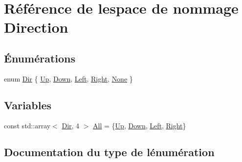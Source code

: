\hypertarget{namespaceDirection}{}\section{Référence de l\textquotesingle{}espace de nommage Direction}
\label{namespaceDirection}
\subsection*{Énumérations}
\begin{DoxyCompactItemize}
\item 
enum \hyperlink{namespaceDirection_aaa56ca1cc2883e1cab31b6cbb5054418}{Dir} \{ \newline
\hyperlink{namespaceDirection_aaa56ca1cc2883e1cab31b6cbb5054418a2dcf8e71283b05e59e3b7d1fa4228623}{Up}, 
\hyperlink{namespaceDirection_aaa56ca1cc2883e1cab31b6cbb5054418aad5dbfe9b746123d7af7381b52a183f1}{Down}, 
\hyperlink{namespaceDirection_aaa56ca1cc2883e1cab31b6cbb5054418aa6314d583c5d1432de99eb3fda30bdea}{Left}, 
\hyperlink{namespaceDirection_aaa56ca1cc2883e1cab31b6cbb5054418a1d010c1da83b45aa3ded2cb937d2d979}{Right}, 
\newline
\hyperlink{namespaceDirection_aaa56ca1cc2883e1cab31b6cbb5054418a1f9c924b3a1502e5e35ed148994c4148}{None}
 \}
\end{DoxyCompactItemize}
\subsection*{Variables}
\begin{DoxyCompactItemize}
\item 
const std\+::array$<$ \hyperlink{namespaceDirection_aaa56ca1cc2883e1cab31b6cbb5054418}{Dir}, 4 $>$ \hyperlink{namespaceDirection_aabd5fd5d609f7dda7f8f50f1dbd563a7}{All} = \{\hyperlink{namespaceDirection_aaa56ca1cc2883e1cab31b6cbb5054418a2dcf8e71283b05e59e3b7d1fa4228623}{Up}, \hyperlink{namespaceDirection_aaa56ca1cc2883e1cab31b6cbb5054418aad5dbfe9b746123d7af7381b52a183f1}{Down}, \hyperlink{namespaceDirection_aaa56ca1cc2883e1cab31b6cbb5054418aa6314d583c5d1432de99eb3fda30bdea}{Left}, \hyperlink{namespaceDirection_aaa56ca1cc2883e1cab31b6cbb5054418a1d010c1da83b45aa3ded2cb937d2d979}{Right}\}
\end{DoxyCompactItemize}


\subsection{Documentation du type de l\textquotesingle{}énumération}
\mbox{\label{namespaceDirection_aaa56ca1cc2883e1cab31b6cbb5054418}} 
